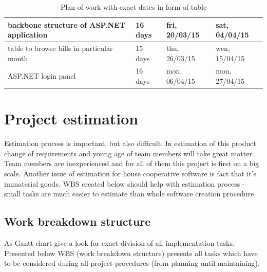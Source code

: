 \documentclass[a4paper,10pt]{report}
\begin{document}
\begin{table}[h]
\begin{tabular}{|l|l|l|l|}
backbone structure of ASP.NET application                                                                   & 16 days               & fri, 20/03/15               & sat, 04/04/15             \\ \hline
table to browse bills in particular month                                                                   & 15 days               & thu, 26/03/15               & wen, 15/04/15             \\ \hline
ASP.NET login panel                                                                                         & 16 days               & mon, 06/04/15               & mon, 27/04/15             \\ \hline
\end{tabular}
\caption{Plan of work with exact dates in form of table}
\end{table}




\chapter{Project estimation}

Estimation process is important, but also difficult. In estimation of this product change of requirements and young age of team members will take great matter. Team members are inexperienced and for all of them this project is first on a big scale. Another issue of estimation for house cooperative software is fact that it's immaterial goods. WBS created below should help with estimation process - small tasks are much easier to estimate than whole software creation procedure. 

\section{Work breakdown structure}
As Gantt chart give a look for exact division of all implementation tasks. Presented below WBS (work breakdown structure) presents all tasks which have to be considered during all project procedures (from planning until maintaining).
\end{document}
